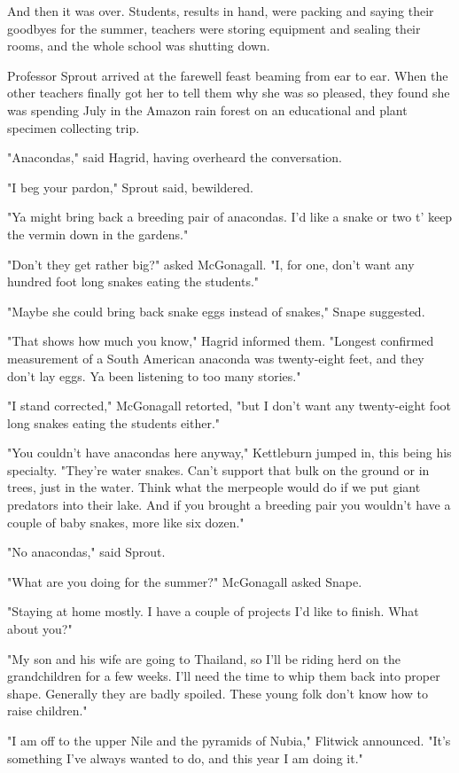 \documentclass[a4paper,11pt]{article}
\begin{document}
And then it was over. Students, results in hand, were packing and saying their goodbyes for the summer, teachers were storing equipment and sealing their rooms, and the whole school was shutting down.

Professor Sprout arrived at the farewell feast beaming from ear to ear. When the other teachers finally got her to tell them why she was so pleased, they found she was spending July in the Amazon rain forest on an educational and plant specimen collecting trip.

"Anacondas," said Hagrid, having overheard the conversation.

"I beg your pardon," Sprout said, bewildered.

"Ya might bring back a breeding pair of anacondas. I'd like a snake or two t' keep the vermin down in the gardens."

"Don't they get rather big?" asked McGonagall. "I, for one, don't want any hundred foot long snakes eating the students."

"Maybe she could bring back snake eggs instead of snakes," Snape suggested.

"That shows how much you know," Hagrid informed them. "Longest confirmed measurement of a South American anaconda was twenty-eight feet, and they don't lay eggs. Ya been listening to too many stories."

"I stand corrected," McGonagall retorted, "but I don't want any twenty-eight foot long snakes eating the students either."

"You couldn't have anacondas here anyway," Kettleburn jumped in, this being his specialty. "They're water snakes. Can't support that bulk on the ground or in trees, just in the water. Think what the merpeople would do if we put giant predators into their lake. And if you brought a breeding pair you wouldn't have a couple of baby snakes, more like six dozen."

"No anacondas," said Sprout.

"What are you doing for the summer?" McGonagall asked Snape.

"Staying at home mostly. I have a couple of projects I'd like to finish. What about you?"

"My son and his wife are going to Thailand, so I'll be riding herd on the grandchildren for a few weeks. I'll need the time to whip them back into proper shape. Generally they are badly spoiled. These young folk don't know how to raise children."

"I am off to the upper Nile and the pyramids of Nubia," Flitwick announced. "It's something I've always wanted to do, and this year I am doing it."
\end{document}
